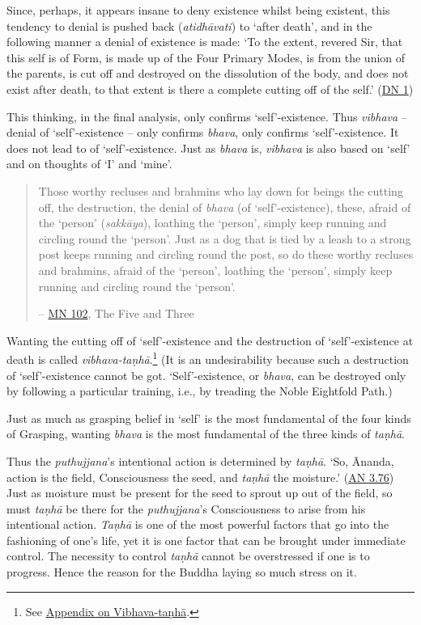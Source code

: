 Since, perhaps, it appears insane to deny existence whilst being existent, this tendency to denial is pushed back (\emph{atidhāvati}) to `after death', and in the following manner a denial of existence is made: `To the extent, revered Sir, that this self is of Form, is made up of the Four Primary Modes, is from the union of the parents, is cut off and destroyed on the dissolution of the body, and does not exist after death, to that extent is there a complete cutting off of the self.' (\href{https://suttacentral.net/dn1/en/bodhi}{DN 1})

This thinking, in the final analysis, only confirms `self'-existence. Thus \emph{vibhava} -- denial of `self'-existence -- only confirms \emph{bhava}, only confirms `self'-existence. It does not lead to  of `self'-existence. Just as \emph{bhava} is, \emph{vibhava} is also based on `self' and on thoughts of `I' and `mine'.

\begin{quote}
Those worthy recluses and brahmins who lay down for beings the cutting off, the destruction, the denial of \emph{bhava} (of `self'-existence), these, afraid of the `person' (\emph{sakkāya}), loathing the `person', simply keep running and circling round the `person'. Just as a dog that is tied by a leash to a strong post keeps running and circling round the post, so do these worthy recluses and brahmins, afraid of the `person', loathing the `person', simply keep running and circling round the `person'.

 -- \href{https://suttacentral.net/mn102/en/sujato}{MN 102}, The Five and Three
\end{quote}

Wanting the cutting off of `self'-existence and the destruction of `self'-existence at death is called \emph{vibhava-taṇhā}.\footnote{See \href{ch-99-appendix.xml\#vibhava-tanha}{Appendix on Vibhava-taṇhā}.} (It is an undesirability because such a destruction of `self'-existence cannot be got. `Self'-existence, or \emph{bhava}, can be destroyed only by following a particular training, i.e., by treading the Noble Eightfold Path.)

Just as much as grasping belief in `self' is the most fundamental of the four kinds of Grasping, wanting \emph{bhava} is the most fundamental of the three kinds of \emph{taṇhā}.

Thus the \emph{puthujjana}'s intentional action is determined by \emph{taṇhā}. `So, Ānanda, action is the field, Consciousness the seed, and \emph{taṇhā} the moisture.' (\href{https://suttacentral.net/an3.76/en/thanissaro}{AN 3.76}) Just as moisture must be present for the seed to sprout up out of the field, so must \emph{taṇhā} be there for the \emph{puthujjana}'s Consciousness to arise from his intentional action. \emph{Taṇhā} is one of the most powerful factors that go into the fashioning of one's life, yet it is one factor that can be brought under immediate control. The necessity to control \emph{taṇhā} cannot be overstressed if one is to progress. Hence the reason for the Buddha laying so much stress on it.

